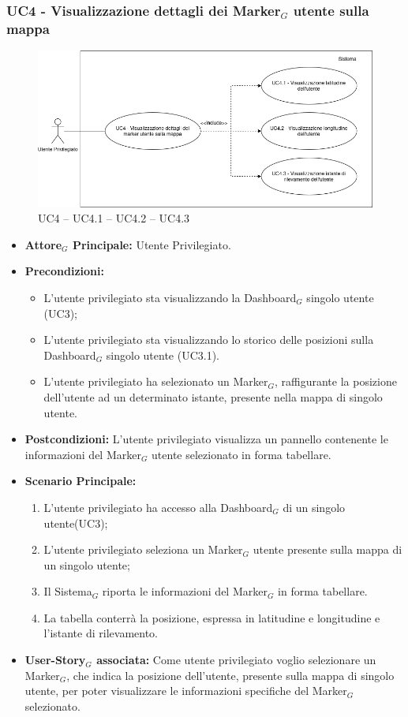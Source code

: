 \documentclass[10pt]{article}
\begin{document}
\begin{justify}
\subsubsection{\textbf{UC4 - Visualizzazione dettagli dei Marker$_G$ utente sulla mappa}}
\begin{figure}[H]
    \centering
    \includegraphics[width=0.7\linewidth]{UC4image.png}
    \caption{UC4 -- UC4.1 -- UC4.2 -- UC4.3}
    \label{fig:UC4}
\end{figure}
\label{UC4}
\begin{itemize}
     \item \textbf{Attore$_G$ Principale:} Utente Privilegiato.
     \item \textbf{Precondizioni:}
        \begin{itemize}
    		\item L'utente privilegiato sta visualizzando la Dashboard$_G$ singolo utente (UC3);
    		\item L'utente privilegiato sta visualizzando lo storico delle posizioni sulla Dashboard$_G$ singolo utente (UC3.1).
          \item L'utente privilegiato ha selezionato un Marker$_G$, raffigurante la posizione dell'utente ad un determinato istante, presente nella mappa di singolo utente.
        \end{itemize}
      \item \textbf{Postcondizioni:} L'utente privilegiato visualizza un pannello contenente le informazioni del Marker$_G$ utente selezionato in forma tabellare. 
      \item \textbf{Scenario Principale:}
        \begin{enumerate}
            \item L'utente privilegiato ha accesso alla Dashboard$_G$ di un singolo utente(UC3);
            \item L'utente privilegiato seleziona un Marker$_G$ utente presente sulla mappa di un singolo utente;
            \item Il Sistema$_G$ riporta le informazioni del Marker$_G$ in forma tabellare.
            \item La tabella conterrà la posizione, espressa in latitudine e longitudine e l'istante di rilevamento.
        \end{enumerate}
     \item \textbf{User-Story$_G$ associata:}
       Come utente privilegiato voglio selezionare un Marker$_G$, che indica la posizione dell'utente, presente sulla mappa di singolo utente, per poter visualizzare le informazioni specifiche del Marker$_G$ selezionato.
\end{itemize}


\end{justify}
\end{document}
